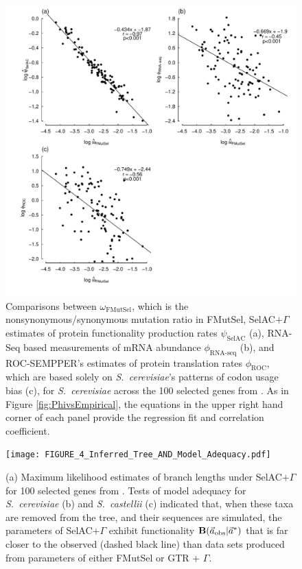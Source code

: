 \documentclass[onecolumn,letterpaper,fleqn,nogrid]{myMBE}%
\newcommand{\Funcaobsvec}{\ensuremath{\Func(\aobsvec|\aoptvec)}\xspace}
\newcommand{\Func}{\ensuremath{\text{\textbf{B}}}\xspace}
\newcommand{\selac}{SelAC\xspace}
\newcommand{\selacplusgamma}{SelAC$+\Gamma$\xspace}
\newcommand{\aobsvec}{\ensuremath{\Vec{a}_{\text{obs}}}\xspace}
\newcommand{\aoptvec}{\ensuremath{\Vec{a}^*}\xspace}
\newcommand{\psihat}{\ensuremath{\hat{\psi}_{\text{\selac}}}\xspace}
\begin{document}
\begin{figure}[H]
  \centering
  \includegraphics[width=0.9\linewidth]{FIGURE_3_MutSelOmega_vs_Us_ROC_Scer_only.pdf}
  \caption{Comparisons between $\omega_{\text{FMutSel}}$, which is the nonsynonymous/synonymous mutation ratio in FMutSel, \selacplusgamma estimates of protein functionality production rates $\psihat$ (a), RNA-Seq based measurements of mRNA abundance $\phi_{\text{RNA-seq}}$ (b), and ROC-SEMPPER's estimates of protein translation rates $\phi_{\text{ROC}}$, which are based solely on \emph{S.~cerevisiae}'s patterns of codon usage bias (c), for \emph{S.~cerevisiae} across the 100 selected genes from \citet{SalichosAndRokas2013}.
    As in Figure \ref{fig:PhivsEmpirical}, the equations in the upper right hand corner of each panel provide the regression fit and correlation coefficient.
}
  \label{fig:OmegavsPsi}
\end{figure}


\begin{figure}[H]
  \centering
  \texttt{[image: FIGURE\_4\_Inferred\_Tree\_AND\_Model\_Adequacy.pdf]}
  \caption{(a) Maximum likelihood estimates of branch lengths under \selacplusgamma for 100 selected genes from \citet{SalichosAndRokas2013}.
    Tests of model adequacy for \emph{S.~cerevisiae} (b) and \emph{S.~castellii} (c) indicated that, when these taxa are removed from the tree, and their sequences are simulated, the parameters of \selacplusgamma exhibit functionality \Funcaobsvec that is far closer to the observed (dashed black line) than data sets produced from parameters of either FMutSel or GTR + $\Gamma$.
}
  \label{fig:TreeAndAdequacy}
\end{figure}
\end{document}
